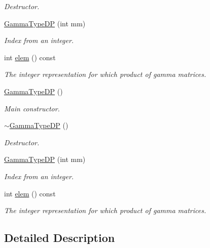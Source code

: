 \begin{DoxyCompactItemize}
\begin{DoxyCompactList}\small\item\em Destructor. \end{DoxyCompactList}\item 
\mbox{\hyperlink{classENSEM_1_1GammaTypeDP_a6a31946a6e7bde24f7bae87f6cfd2add}{Gamma\+Type\+DP}} (int mm)
\begin{DoxyCompactList}\small\item\em Index from an integer. \end{DoxyCompactList}\item 
int \mbox{\hyperlink{classENSEM_1_1GammaTypeDP_a0d7ad0581feda4578c3ee7631ce730e2}{elem}} () const
\begin{DoxyCompactList}\small\item\em The integer representation for which product of gamma matrices. \end{DoxyCompactList}\item 
\mbox{\hyperlink{classENSEM_1_1GammaTypeDP_a1833bb262c5e172a0463d853c76c1d18}{Gamma\+Type\+DP}} ()
\begin{DoxyCompactList}\small\item\em Main constructor. \end{DoxyCompactList}\item 
\mbox{\hyperlink{classENSEM_1_1GammaTypeDP_ad0e6f055b87687dac9b7b95e6ec808b0}{$\sim$\+Gamma\+Type\+DP}} ()
\begin{DoxyCompactList}\small\item\em Destructor. \end{DoxyCompactList}\item 
\mbox{\hyperlink{classENSEM_1_1GammaTypeDP_a6a31946a6e7bde24f7bae87f6cfd2add}{Gamma\+Type\+DP}} (int mm)
\begin{DoxyCompactList}\small\item\em Index from an integer. \end{DoxyCompactList}\item 
int \mbox{\hyperlink{classENSEM_1_1GammaTypeDP_a0d7ad0581feda4578c3ee7631ce730e2}{elem}} () const
\begin{DoxyCompactList}\small\item\em The integer representation for which product of gamma matrices. \end{DoxyCompactList}\end{DoxyCompactItemize}


\subsection{Detailed Description}
